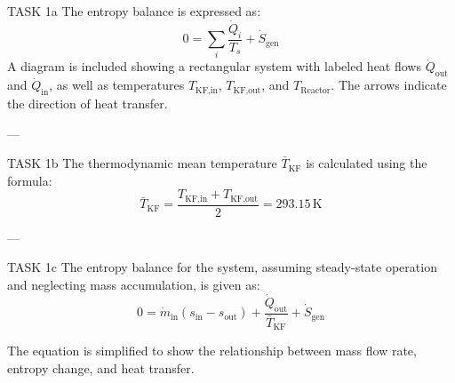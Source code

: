 TASK 1a  
The entropy balance is expressed as:  
\[
0 = \sum_i \frac{\dot{Q}_i}{T_s} + \dot{S}_{\text{gen}}
\]  
A diagram is included showing a rectangular system with labeled heat flows \( \dot{Q}_{\text{out}} \) and \( \dot{Q}_{\text{in}} \), as well as temperatures \( T_{\text{KF,in}} \), \( T_{\text{KF,out}} \), and \( T_{\text{Reactor}} \). The arrows indicate the direction of heat transfer.

---

TASK 1b  
The thermodynamic mean temperature \( \bar{T}_{\text{KF}} \) is calculated using the formula:  
\[
\bar{T}_{\text{KF}} = \frac{T_{\text{KF,in}} + T_{\text{KF,out}}}{2} = 293.15 \, \text{K}
\]  

---

TASK 1c  
The entropy balance for the system, assuming steady-state operation and neglecting mass accumulation, is given as:  
\[
0 = \dot{m}_{\text{in}}(s_{\text{in}} - s_{\text{out}}) + \frac{\dot{Q}_{\text{out}}}{\bar{T}_{\text{KF}}} + \dot{S}_{\text{gen}}
\]  

The equation is simplified to show the relationship between mass flow rate, entropy change, and heat transfer.